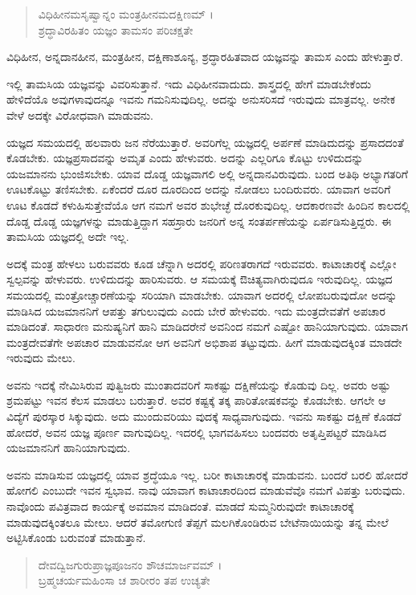 \begin{verse}
ವಿಧಿಹೀನಮಸೃಷ್ವಾನ್ನಂ ಮಂತ್ರಹೀನಮದಕ್ಷಿಣಮ್ ।\\ಶ್ರದ್ಧಾವಿರಹಿತಂ ಯಜ್ಞಂ ತಾಮಸಂ ಪರಿಚಕ್ಷತೇ 
\end{verse}

{\small ವಿಧಿಹೀನ, ಅನ್ನದಾನಹೀನ, ಮಂತ್ರಹೀನ, ದಕ್ಷಿಣಾಶೂನ್ಯ, ಶ್ರದ್ಧಾರಹಿತವಾದ ಯಜ್ಞವನ್ನು ತಾಮಸ ಎಂದು ಹೇಳುತ್ತಾರೆ.}

ಇಲ್ಲಿ ತಾಮಸಿಯ ಯಜ್ಞವನ್ನು ವಿವರಿಸುತ್ತಾನೆ. ಇದು ವಿಧಿಹೀನವಾದುದು. ಶಾಸ್ತ್ರದಲ್ಲಿ ಹೇಗೆ ಮಾಡಬೇಕೆಂದು ಹೇಳಿದೆಯೊ ಅವುಗಳಾವುದನ್ನೂ ಇವನು ಗಮನಿಸುವುದಿಲ್ಲ. ಅದನ್ನು ಅನುಸರಿಸದೆ ಇರುವುದು ಮಾತ್ರವಲ್ಲ. ಅನೇಕ ವೇಳೆ ಅದಕ್ಕೇ ವಿರೋಧವಾಗಿ ಮಾಡುವನು.

ಯಜ್ಞದ ಸಮಯದಲ್ಲಿ ಹಲವಾರು ಜನ ನೆರೆಯುತ್ತಾರೆ. ಅವರಿಗೆಲ್ಲ ಯಜ್ಞದಲ್ಲಿ ಅರ್ಪಣೆ ಮಾಡಿದುದನ್ನು ಪ್ರಸಾದದಂತೆ ಕೊಡಬೇಕು. ಯಜ್ಞಪ್ರಸಾದವನ್ನು ಅಮೃತ ಎಂದು ಹೇಳುವರು. ಅದನ್ನು ಎಲ್ಲರಿಗೂ ಕೊಟ್ಟು ಉಳಿದುದನ್ನು ಯಜಮಾನನು ಭುಂಜಿಸಬೇಕು. ಯಾವ ದೊಡ್ಡ ಯಜ್ಞವಾಗಲಿ ಅಲ್ಲಿ ಅನ್ನದಾನವಿರುವುದು. ಬಂದ ಅತಿಥಿ ಅಭ್ಯಾಗತರಿಗೆ ಊಟಕೊಟ್ಟು ತಣಿಸಬೇಕು. ಏಕೆಂದರೆ ದೂರ ದೂರದಿಂದ ಅದನ್ನು ನೋಡಲು ಬಂದಿರುವರು. ಯಾವಾಗ ಅವರಿಗೆ ಊಟ ಕೊಡದೆ ಕಳುಹಿಸುತ್ತೇವೆಯೊ ಆಗ ನಮಗೆ ಅವರ ಶುಭೇಚ್ಛೆ ದೊರಕುವುದಿಲ್ಲ. ಆದಕಾರಣವೇ ಹಿಂದಿನ ಕಾಲದಲ್ಲಿ ದೊಡ್ಡ ದೊಡ್ಡ ಯಜ್ಞಗಳನ್ನು ಮಾಡುತ್ತಿದ್ದಾಗ ಸಹಸ್ರಾರು ಜನರಿಗೆ ಅನ್ನ ಸಂತರ್ಪಣೆಯನ್ನು ಏರ್ಪಡಿಸುತ್ತಿದ್ದರು. ಈ ತಾಮಸಿಯ ಯಜ್ಞದಲ್ಲಿ ಅದೇ ಇಲ್ಲ.

ಅದಕ್ಕೆ ಮಂತ್ರ ಹೇಳಲು ಬರುವವರು ಕೂಡ ಚೆನ್ನಾಗಿ ಅದರಲ್ಲಿ ಪರಿಣತರಾಗದೆ ಇರುವವರು. ಕಾಟಾಚಾರಕ್ಕೆ ಎಲ್ಲೋ ಸ್ವಲ್ಪವನ್ನು ಹೇಳುವರು. ಉಳಿದುದನ್ನು ಹಾರಿಸುವರು. ಆ ಸಮಯಕ್ಕೆ ಔಚಿತ್ಯವಾಗಿರುವುದೂ ಇರುವುದಿಲ್ಲ. ಯಜ್ಞದ ಸಮಯದಲ್ಲಿ ಮಂತ್ರೋಚ್ಚಾರಣೆಯನ್ನು ಸರಿಯಾಗಿ ಮಾಡಬೇಕು. ಯಾವಾಗ ಅದರಲ್ಲಿ ಲೋಪಬರುವುದೋ ಅದನ್ನು ಮಾಡಿಸಿದ ಯಜಮಾನನಿಗೆ ಆಪತ್ತು ತಗುಲುವುದು ಎಂದು ಬೇರೆ ಹೇಳುವರು. ಇದು ಮಂತ್ರದೇವತೆಗೆ ಅಪಚಾರ ಮಾಡಿದಂತೆ. ಸಾಧಾರಣ ಮನುಷ್ಯನಿಗೆ ಹಾನಿ ಮಾಡಿದರೇನೆ ಅವನಿಂದ ನಮಗೆ ಎಷ್ಟೋ ಹಾನಿಯಾಗುವುದು. ಯಾವಾಗ ಮಂತ್ರದೇವತೆಗೇ ಅಪಚಾರ ಮಾಡುವನೋ ಆಗ ಅವನಿಗೆ ಅಭಿಶಾಪ ತಟ್ಟುವುದು. ಹೀಗೆ ಮಾಡುವುದಕ್ಕಿಂತ ಮಾಡದೇ ಇರುವುದು ಮೇಲು. 

ಅವನು ಇದಕ್ಕೆ ನೇಮಿಸಿರುವ ಪುತ್ವಿಜರು ಮುಂತಾದವರಿಗೆ ಸಾಕಷ್ಟು ದಕ್ಷಿಣೆಯನ್ನು ಕೊಡುವು ದಿಲ್ಲ. ಅವರು ಅಷ್ಟು ಶ್ರಮಪಟ್ಟು ಇವನ ಕೆಲಸ ಮಾಡಲು ಬರುತ್ತಾರೆ. ಅವರ ಕಷ್ಟಕ್ಕೆ ತಕ್ಕ ಪಾರಿತೋಷಕವನ್ನು ಕೊಡಬೇಕು. ಆಗಲೇ ಆ ವಿದ್ಯೆಗೆ ಪುರಸ್ಕಾರ ಸಿಕ್ಕುವುದು. ಅದು ಮುಂದುವರಿಯು ವುದಕ್ಕೆ ಸಾಧ್ಯವಾಗುವುದು. ಇವನು ಸಾಕಷ್ಟು ದಕ್ಷಿಣೆ ಕೊಡದೆ ಹೋದರೆ, ಅವನ ಯಜ್ಞ ಪೂರ್ಣ ವಾಗುವುದಿಲ್ಲ. ಇದರಲ್ಲಿ ಭಾಗವಹಿಸಲು ಬಂದವರು ಅತೃಪ್ತಿಪಟ್ಟರೆ ಮಾಡಿಸಿದ ಯಜಮಾನನಿಗೆ ಹಾನಿಯಾಗುವುದು.

ಅವನು ಮಾಡಿಸುವ ಯಜ್ಞದಲ್ಲಿ ಯಾವ ಶ್ರದ್ಧೆಯೂ ಇಲ್ಲ. ಬರೀ ಕಾಟಾಚಾರಕ್ಕೆ ಮಾಡುವನು. ಬಂದರೆ ಬರಲಿ ಹೋದರೆ ಹೋಗಲಿ ಎಂಬುದೇ ಇವನ ಸ್ವಭಾವ. ನಾವು ಯಾವಾಗ ಕಾಟಾಚಾರದಿಂದ ಮಾಡುವೆವೊ ನಮಗೆ ವಿಪತ್ತು ಬರುವುದು. ನಾವೊಂದು ಪವಿತ್ರವಾದ ಕಾರ್ಯಕ್ಕೆ ಅವಮಾನ ಮಾಡಿದಂತೆ. ಮಾಡದೆ ಸುಮ್ಮನಿರುವುದೇ ಕಾಟಾಚಾರಕ್ಕೆ ಮಾಡುವುದಕ್ಕಿಂತಲೂ ಮೇಲು. ಆದರೆ ತಮೋಗುಣಿ ತೆಪ್ಪಗೆ ಮಲಗಿಕೊಂಡಿರುವ ಬೇಟೆನಾಯಿಯನ್ನು ತನ್ನ ಮೇಲೆ ಅಟ್ಟಿಸಿಕೊಂಡು ಬರುವಂತೆ ಮಾಡುತ್ತಾನೆ.

\begin{verse}
ದೇವದ್ವಿಜಗುರುಪ್ರಾಜ್ಞಪೂಜನಂ ಶೌಚಮಾರ್ಜವಮ್ ।\\ಬ್ರಹ್ಮಚರ್ಯಮಹಿಂಸಾ ಚ ಶಾರೀರಂ ತಪ ಉಚ್ಯತೇ 
\end{verse}


